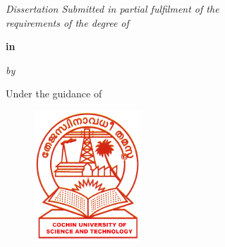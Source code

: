 \thispagestyle{empty}
\begin{center}
    {\LARGE {\bfseries {\mytitle{} }}\par}
    

    \vspace{2\baselineskip}

    {\textit{Dissertation Submitted in partial fulfilment of the}\\
    \textit{requirements of the degree of}}
    
    \vspace{0.5\baselineskip}
    {\Large{\bfseries {\mydegree{}}} \par}
    {\large{\bfseries {in}} \par}
    {\Large{\bfseries {\myspecialization{}}}\par}
    
    \vspace{0.5\baselineskip}
    {\textit{by}\par}
    \vspace{0.3\baselineskip}
    
    {\Large \bfseries{\myname{}}\par}
    {\Large \bfseries{\myregnum{}}\par}
    
    \vspace{1\baselineskip}
    {Under the guidance of \par}
    \vspace{0.5\baselineskip}
    {\Large \bfseries{ \myguide{}}\par}
    \vspace{0.5\baselineskip}
    
    {\begin{figure}[!h] 
	\centering
	\includegraphics[width=40mm]{./Images/cusat.png} 
     \end{figure}
    }
    
    \vspace{0.3\baselineskip}
    {\large \bfseries \MakeUppercase{{\mydep{}}} \par}
    {\large \bfseries\MakeUppercase{{\myuni{}}}\par}
    \vspace{0.3\baselineskip}
    {\large \bfseries {\mymonth{} \myyear{}}\par}
    
    
\end{center}